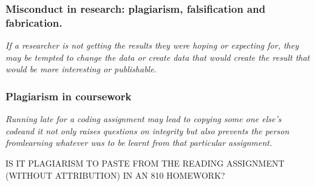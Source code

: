 \documentclass{beamer}
\begin{document}
\begin{frame} %

\frametitle{Misconduct in research: plagiarism, falsification and fabrication.}

{\it  If a researcher is not getting the results they were hoping or expecting for, they may be tempted to change the data or create data that would create the result that would be more interesting or publishable.}





\end{frame}

\begin{frame} %

\frametitle{Plagiarism in coursework}

  {\it Running late for a coding assignment may lead to copying some one else’s codeand it not  only raises questions on  integrity but also  prevents the  person fromlearning whatever was to be learnt from that particular assignment.}
  




\medskip


\medskip

IS IT PLAGIARISM TO PASTE FROM THE READING ASSIGNMENT (WITHOUT ATTRIBUTION) IN AN 810 HOMEWORK?

\end{frame}
\end{document}
